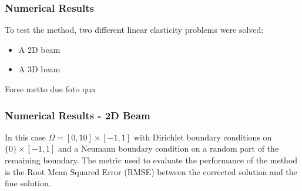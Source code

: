 \documentclass{beamer}
\begin{document}
\begin{frame}
    \frametitle{Numerical Results}
    To test the method, two different linear elasticity problems were solved:
    \begin{itemize}
        \item A 2D beam
        \item A 3D beam
    \end{itemize}
    Forse metto due foto qua
\end{frame}

\begin{frame}
    \frametitle{Numerical Results - 2D Beam}
    In this case \( \Omega = [0, 10] \times [-1, 1] \) with Dirichlet boundary conditions on \(\{0\} \times [-1, 1]\) and a Neumann boundary condition on a random part of the remaining boundary.
    The metric used to evaluate the performance of the method is the Root Mean Squared Error (RMSE) between the corrected solution and the fine solution.
\end{frame}
\end{document}
